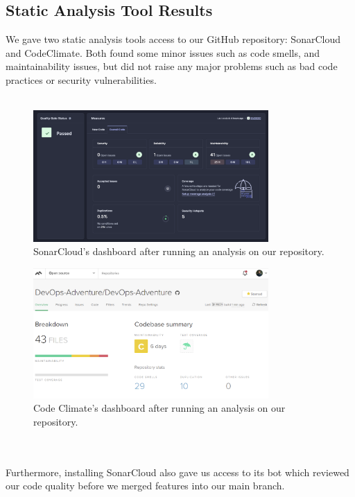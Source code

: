 \documentclass{article}
\begin{document}
\subsection{Static Analysis Tool Results}
We gave two static analysis tools access to our GitHub repository: SonarCloud and CodeClimate. Both found some minor issues such as code smells, and maintainability issues, but did not raise any major problems such as bad code practices or security vulnerabilities. 
\\\\
\begin{figure}[ht]
    \centering
    \includegraphics[width=0.8\textwidth]{./images/SonarCloud_Analysis.png}
    \caption{SonarCloud's dashboard after running an analysis on our repository.}
    \label{fig:notion-dashboard}
\end{figure}
\begin{figure}[ht]
    \centering
    \includegraphics[width=0.8\textwidth]{./images/CodeClimate_analysis.png}
    \caption{Code Climate's dashboard after running an analysis on our repository.}
    \label{fig:notion-dashboard}
\end{figure}
\\\\
Furthermore, installing SonarCloud also gave us access to its bot which reviewed our code quality before we merged features into our main branch.
\\\\
\end{document}
